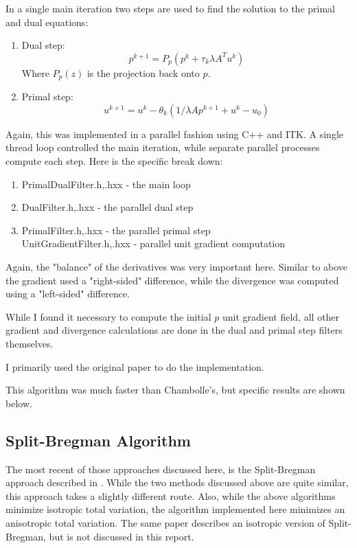 \documentclass[11pt]{article}
\begin{document}
In a single main iteration two steps are used to find the solution to the primal and dual equations:
\begin{enumerate}
\item Dual step:
\begin{equation}
p^{k+1} = P_p(p^k + \tau_k \lambda A^T u^k)
\label{pd:dual}
\end{equation}
Where $P_p(z)$ is the projection back onto $p$.
\item Primal step:
\begin{equation}
u^{k+1} = u^k - \theta_k (1/\lambda Ap^{k+1} + u^k-u_0)
\label{pd:primal}
\end{equation}
\end{enumerate}

Again, this was implemented in a parallel fashion using C++ and ITK.
A single thread loop controlled the main iteration, while separate parallel processes compute each step.
Here is the specific break down:
\begin{enumerate}
\item PrimalDualFilter.h,.hxx - the main loop
\item DualFilter.h,.hxx - the parallel dual step
\item PrimalFilter.h,.hxx - the parallel primal step\\
UnitGradientFilter.h,.hxx - parallel unit gradient computation
\end{enumerate}

Again, the "balance" of the derivatives was very important here.
Similar to above the gradient used a "right-sided" difference, while the divergence was computed using a "left-sided" difference.

While I found it necessary to compute the initial $p$ unit gradient field, all other gradient and divergence calculations are done in the dual and primal step filters themselves.

I primarily used the original paper to do the implementation.

This algorithm was much faster than Chambolle's, but specific results are shown below.

\subsection{Split-Bregman Algorithm}
The most recent of those approaches discussed here, is the Split-Bregman approach described in \cite{goldstein2009split}.  
While the two methods discussed above are quite similar, this approach takes a slightly different route.
Also, while the above algorithms minimize isotropic total variation, the algorithm implemented here minimizes an anisotropic total variation.
The same paper \cite{goldstein2009split} describes an isotropic version of Split-Bregman, but is not discussed in this report.
\end{document}

